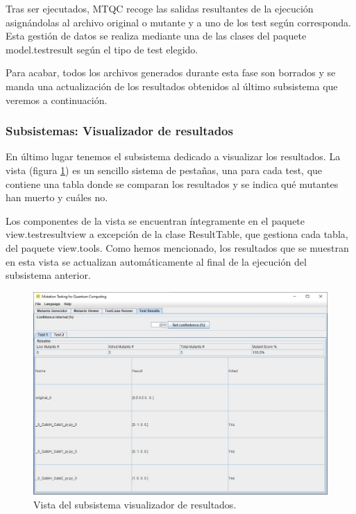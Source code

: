 Tras ser ejecutados, MTQC recoge las salidas resultantes de la ejecución asignándolas al archivo original o mutante y a uno de los test según corresponda. Esta gestión de datos se realiza mediante una de las clases del paquete model.testresult según el tipo de test elegido.

Para acabar, todos los archivos generados durante esta fase son borrados y se manda una actualización de los resultados obtenidos al último subsistema que veremos a continuación.

\subsubsection{Subsistemas: Visualizador de resultados}

En último lugar tenemos el subsistema dedicado a visualizar los resultados. La vista (figura \ref{fig:vista4}) es un sencillo sistema de pestañas, una para cada test, que contiene una tabla donde se comparan los resultados y se indica qué mutantes han muerto y cuáles no.

Los componentes de la vista se encuentran íntegramente en el paquete view.testresultview a excepción de la clase ResultTable, que gestiona cada tabla, del paquete view.tools. Como hemos mencionado, los resultados que se muestran en esta vista se actualizan automáticamente al final de la ejecución del subsistema anterior.

\begin{figure}[htb]
\begin{center}
\includegraphics[scale=0.45]{images/vista4}
\end{center}
\caption{Vista del subsistema visualizador de resultados.}
\label{fig:vista4}
\end{figure}

